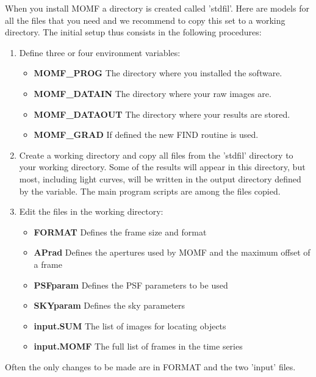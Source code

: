 \documentclass[]{article}
\begin{document}
When you install MOMF a directory is created called 'stdfil'.
Here are models for all the files that you need and we recommend 
to copy this set to a working directory. The initial setup thus
consists in the following procedures:
\begin{enumerate}
\item Define three or four environment variables:
\begin{itemize}
\item {\bf MOMF\_PROG} The directory where you installed the software.
\item {\bf MOMF\_DATAIN} The directory where your raw images are.
\item {\bf MOMF\_DATAOUT} The directory where your results are stored.
\item {\bf MOMF\_GRAD} If defined the new FIND routine is used.
\end{itemize}
\item Create a working directory and copy all files from the 'stdfil'
directory to your working directory. Some of the results will appear
in this directory, but most, including light curves, will be written
in the output directory defined by the variable. The main program scripts
are among the files copied.
\item Edit the files in the working directory:
\begin{itemize}
\item {\bf FORMAT} Defines the frame size and format
\item {\bf APrad} Defines the apertures used by MOMF and the maximum offset of a frame
\item {\bf PSFparam} Defines the PSF parameters to be used
\item {\bf SKYparam} Defines the sky parameters
\item {\bf input.SUM} The list of images for locating objects
\item {\bf input.MOMF} The full list of frames in the time series
\end{itemize}
\end{enumerate}
Often the only changes to be made are in FORMAT and the two 'input'
files.
\end{document}
